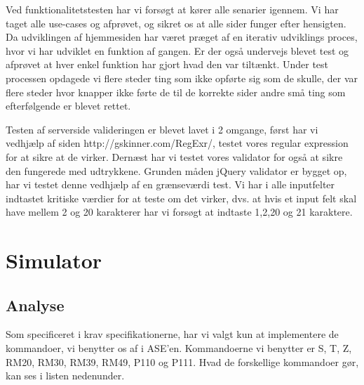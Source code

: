 \documentclass[a4paper]{article}
\begin{document}
Ved funktionalitetstesten har vi forsøgt at kører alle senarier igennem. Vi har taget alle use-cases og afprøvet, og sikret os at alle sider funger efter hensigten. Da udviklingen af hjemmesiden har været præget af en iterativ udviklings proces, hvor vi har udviklet en funktion af gangen. Er der også undervejs blevet test og afprøvet at hver enkel funktion har gjort hvad den var tiltænkt. Under test processen opdagede vi flere steder ting som ikke opførte sig som de skulle, der var flere steder hvor knapper ikke førte de til de korrekte sider andre små ting som efterfølgende er blevet rettet. 

Testen af serverside valideringen er blevet lavet i 2 omgange, først har vi vedhjælp af siden http://gskinner.com/RegExr/, testet vores regular expression for at sikre at de virker. Dernæst har vi testet vores validator for også at sikre den fungerede med udtrykkene. Grunden måden jQuery validator er bygget op, har vi testet denne vedhjælp af en grænseværdi test. Vi har i alle inputfelter indtastet kritiske værdier for at teste om det virker, dvs. at hvis et input felt skal have mellem 2 og 20 karakterer har vi forsøgt at indtaste 1,2,20 og 21 karaktere.  


\clearpage



\section{Simulator} %

\subsection{Analyse} %

Som specificeret i krav specifikationerne, har vi valgt kun at implementere de kommandoer, vi benytter os af i ASE’en. Kommandoerne vi benytter er S, T, Z, RM20, RM30, RM39, RM49, P110 og P111. Hvad de forskellige kommandoer gør, kan ses i listen nedenunder.
\end{document}
